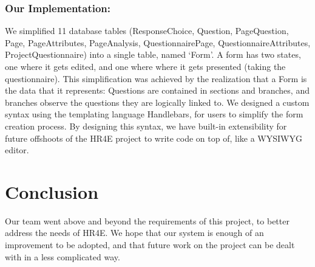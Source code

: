 \documentclass[10pt]{article}
\begin{document}
\subsubsection*{Our Implementation:}
We simplified 11 database tables (ResponseChoice, Question, PageQuestion, Page, PageAttributes,  PageAnalysis, QuestionnairePage, QuestionnaireAttributes, ProjectQuestionnaire) into a single table, named `Form'. A form has two states, one where it gets edited, and one where where it gets presented (taking the questionnaire). This simplification was achieved by the realization that a Form is the data that it represents: Questions are contained in sections and branches, and branches observe the questions they are logically linked to. We designed a custom syntax using the templating language Handlebars, for users to simplify the form creation process. By designing this syntax, we have built-in extensibility for future offshoots of the HR4E project to write code on top of, like a WYSIWYG editor.


\section*{Conclusion}
Our team went above and beyond the requirements of this project, to better address the needs of HR4E. We hope that our system is enough of an improvement to be adopted, and that future work on the project can be dealt with in a less complicated way.
\end{document}
